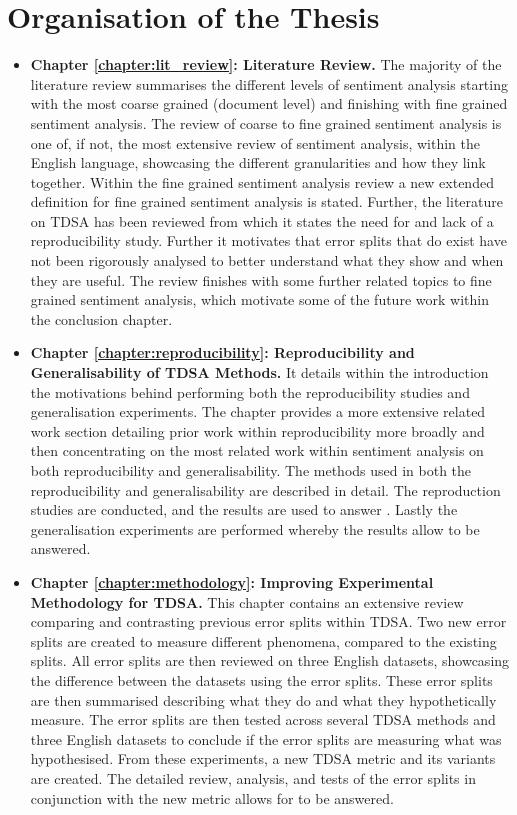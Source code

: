 \section{Organisation of the Thesis}
\begin{itemize}
    \item \textbf{Chapter \ref{chapter:lit_review}: Literature Review.}\newline
    The majority of the literature review summarises the different levels of sentiment analysis starting with the most coarse grained (document level) and finishing with fine grained sentiment analysis. The review of coarse to fine grained sentiment analysis is one of, if not, the most extensive review of sentiment analysis, within the English language, showcasing the different granularities and how they link together. Within the fine grained sentiment analysis review a new extended definition for fine grained sentiment analysis is stated. Further, the literature on TDSA has been reviewed from which it states the need for and lack of a reproducibility study. Further it motivates that error splits that do exist have not been rigorously analysed to better understand what they show and when they are useful. The review finishes with some further related topics to fine grained sentiment analysis, which motivate some of the future work within the conclusion chapter.
    \item \textbf{Chapter \ref{chapter:reproducibility}: Reproducibility and Generalisability of TDSA Methods.}\newline
    It details within the introduction the motivations behind performing both the reproducibility studies and generalisation experiments. The chapter provides a more extensive related work section detailing prior work within reproducibility more broadly and then concentrating on the most related work within sentiment analysis on both reproducibility and generalisability. The methods used in both the reproducibility and generalisability are described in detail. The reproduction studies are conducted, and the results are used to answer . Lastly the generalisation experiments are performed whereby the results allow  to be answered.
    \item \textbf{Chapter \ref{chapter:methodology}: Improving Experimental Methodology for TDSA.}\newline
    This chapter contains an extensive review comparing and contrasting previous error splits within TDSA. Two new error splits are created to measure different phenomena, compared to the existing splits. All error splits are then reviewed on three English datasets, showcasing the difference between the datasets using the error splits. These error splits are then summarised describing what they do and what they hypothetically measure. The error splits are then tested across several TDSA methods and three English datasets to conclude if the error splits are measuring what was hypothesised. From these experiments, a new TDSA metric and its variants are created. The detailed review, analysis, and tests of the error splits in conjunction with the new metric allows for  to be answered.

\end{itemize}
